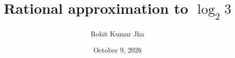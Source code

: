 \documentclass[11pt,oneside]{amsart}
\title[Rational approximation to $\log_2 3$]
 {Rational approximation to \texorpdfstring{$\log_2 3$}{log2 3}}
\author{Rohit Kumar Jha}
\date{October 9, 2026}
\begin{document}
\begin{abstract}

\end{abstract}
\maketitle

\end{document}
